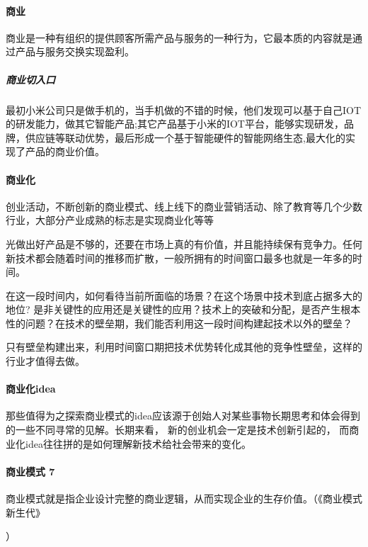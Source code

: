 \documentclass[letterpaper,11pt,english]{sphinxmanual}
\begin{document}
\paragraph{商业}
\label{\detokenize{chapter_idea/business:id5}}
商业是一种有组织的提供顾客所需产品与服务的一种行为，它最本质的内容就是通过产品与服务交换实现盈利。


\subparagraph{商业切入口}
\label{\detokenize{chapter_idea/business:id6}}
最初小米公司只是做手机的，当手机做的不错的时候，他们发现可以基于自己IOT的研发能力，做其它智能产品;其它产品基于小米的IOT平台，能够实现研发，品牌，供应链等联动优势，最后形成一个基于智能硬件的智能网络生态,最大化的实现了产品的商业价值。


\paragraph{商业化}
\label{\detokenize{chapter_idea/business:id7}}
创业活动，不断创新的商业模式、线上线下的商业营销活动、除了教育等几个少数行业，大部分产业成熟的标志是实现商业化等等

光做出好产品是不够的，还要在市场上真的有价值，并且能持续保有竞争力。任何新技术都会随着时间的推移而扩散，一般所拥有的时间窗口最多也就是一年多的时间。

在这一段时间内，如何看待当前所面临的场景？在这个场景中技术到底占据多大的地位?
是非关键性的应用还是关键性的应用？技术上的突破和分配，是否产生根本性的问题？在技术的壁垒期，我们能否利用这一段时间构建起技术以外的壁垒？

只有壁垒构建出来，利用时间窗口期把技术优势转化成其他的竞争性壁垒，这样的行业才值得去做。%
\begin{footnote}[333]\sphinxAtStartFootnote
{}
%
\end{footnote}


\paragraph{商业化idea}
\label{\detokenize{chapter_idea/business:idea}}
那些值得为之探索商业模式的idea应该源于创始人对某些事物长期思考和体会得到的一些不同寻常的见解。长期来看，
新的创业机会一定是技术创新引起的，
而商业化idea往往拼的是如何理解新技术给社会带来的变化。


\paragraph{商业模式 7\sphinxfootnotemark[334]}
\label{\detokenize{chapter_idea/business:id8}}%
\begin{footnotetext}[334]\sphinxAtStartFootnote
{}
%
\end{footnotetext}\ignorespaces 
商业模式就是指企业设计完整的商业逻辑，从而实现企业的生存价值。（《商业模式新生代》%
\begin{footnote}[335]\sphinxAtStartFootnote
{}
%
\end{footnote}）
\end{document}
